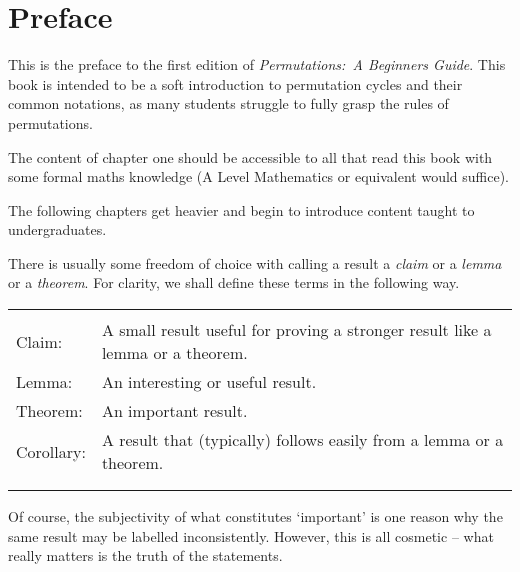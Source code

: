 \section*{Preface}\label{sec:preface}


This is the preface to the first edition of \textit{Permutations:~A Beginners Guide}. This book is intended to be a soft introduction to permutation cycles and their common notations, as many students struggle to fully grasp the rules of permutations. %

The content of chapter one should be accessible to all that read this book with some formal maths knowledge (A Level Mathematics or equivalent would suffice).

The following chapters get heavier and begin to introduce content taught to undergraduates.

There is usually some freedom of choice with calling a result a \textit{claim} or a \textit{lemma} or a \textit{theorem}. For clarity, we shall define these terms in the following way.

\begin{table}[h]
    \centering
    \begin{tabular}{ll}\hline\\[-15pt]\hline\\[-12pt]
        Claim:      & A small result useful for proving a stronger result like a lemma or a theorem.\\
        Lemma:      & An interesting or useful result.\\
        Theorem:    & An important result.\\
        Corollary:  & A result that (typically) follows easily from a lemma or a theorem.\\[2pt]
        \hline\\[-15pt]\hline\\
    \end{tabular}
\end{table}\vspace*{-20pt}

Of course, the subjectivity of what constitutes `important' is one reason why the same result may be labelled inconsistently. However, this is all cosmetic -- what really matters is the truth of the statements.